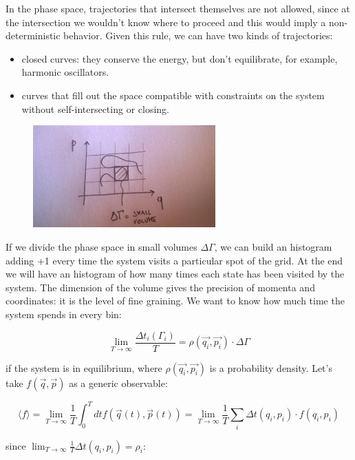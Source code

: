 \documentclass[a4paper, italian, openany]{book}
\begin{document}
In the phase space, trajectories that intersect themselves are not allowed, since at the intersection we wouldn't know where to proceed and this would imply a non-deterministic behavior. Given this rule, we can have two kinds of trajectories:
\begin{itemize}
\item closed curves: they conserve the energy, but don't equilibrate, for example, harmonic oscillators.
\item curves that fill out the space compatible with constraints on the system without self-intersecting or closing.
\end{itemize}


\begin{figure}[H]
\centering
\includegraphics[width=70mm]{img/figure2.jpg}
\end{figure}

If we divide the phase space in small volumes $\Delta \Gamma$, we can build an histogram adding +1 every time the system visits a particular spot of the grid. At the end we will have an histogram of how many times each state has been visited by the system. The dimension of the volume gives the precision of momenta and coordinates: it is the level of fine graining.\newline
We want to know how much time the system spends in every bin:

$$\lim_{T \to \infty} \frac{\Delta t_i(\Gamma_i)}{T} = \rho(\overrightarrow{q_i}, \overrightarrow{p_i}) \cdot \Delta \Gamma$$ 

if the system is in equilibrium, where $\rho(\overrightarrow{q_i}, \overrightarrow{p_i})$ is a probability density.\newline
Let's take $f(\overrightarrow{q}, \overrightarrow{p})$ as a generic observable:

$$\langle f \rangle = \lim_{T \to \infty} \frac{1}{T} \int_0^T dt f(\overrightarrow{q}(t), \overrightarrow{p}(t)) = \lim_{T \to \infty} \frac{1}{T}\sum_i \Delta t(q_i, p_i) \cdot f(q_i, p_i)$$

since $\lim_{T \to \infty} \frac{1}{T} \Delta t(q_i, p_i) = \rho_i$:
\end{document}
